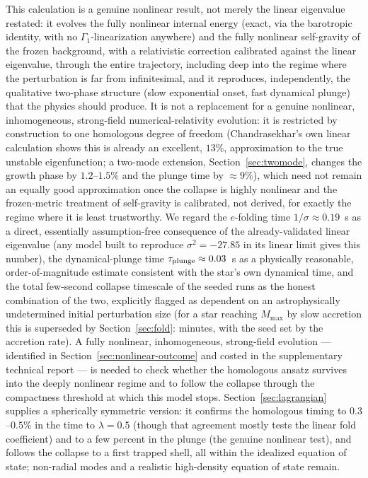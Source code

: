 \documentclass[11pt]{article}
\begin{document}
This calculation is a genuine nonlinear result, not merely the linear eigenvalue restated: it evolves the fully nonlinear internal energy (exact, via the barotropic identity, with no $\Gamma_1$-linearization anywhere) and the fully nonlinear self-gravity of the frozen background, with a relativistic correction calibrated against the linear eigenvalue, through the entire trajectory, including deep into the regime where the perturbation is far from infinitesimal, and it reproduces, independently, the qualitative two-phase structure (slow exponential onset, fast dynamical plunge) that the physics should produce. It is not a replacement for a genuine nonlinear, inhomogeneous, strong-field numerical-relativity evolution: it is restricted by construction to one homologous degree of freedom (Chandrasekhar's own linear calculation shows this is already an excellent, $13\%$, approximation to the true unstable eigenfunction; a two-mode extension, Section~\ref{sec:twomode}, changes the growth phase by $1.2$--$1.5\%$ and the plunge time by $\approx9\%$), which need not remain an equally good approximation once the collapse is highly nonlinear and the frozen-metric treatment of self-gravity is calibrated, not derived, for exactly the regime where it is least trustworthy. We regard the $e$-folding time $1/\sigma\approx0.19$~s as a direct, essentially assumption-free consequence of the already-validated linear eigenvalue (any model built to reproduce $\sigma^2=-27.85$ in its linear limit gives this number), the dynamical-plunge time $\tau_{\rm plunge}\approx0.03$~s as a physically reasonable, order-of-magnitude estimate consistent with the star's own dynamical time, and the total few-second collapse timescale of the seeded runs as the honest combination of the two, explicitly flagged as dependent on an astrophysically undetermined initial perturbation size (for a star reaching $M_{\max}$ by slow accretion this is superseded by Section~\ref{sec:fold}: minutes, with the seed set by the accretion rate). A fully nonlinear, inhomogeneous, strong-field evolution --- identified in Section~\ref{sec:nonlinear-outcome} and costed in the supplementary technical report \citep{OwnbyPhase2} --- is needed to check whether the homologous ansatz survives into the deeply nonlinear regime and to follow the collapse through the compactness threshold at which this model stops. Section~\ref{sec:lagrangian} supplies a spherically symmetric version: it confirms the homologous timing to $0.3$--$0.5\%$ in the time to $\lambda=0.5$ (though that agreement mostly tests the linear fold coefficient) and to a few percent in the plunge (the genuine nonlinear test), and follows the collapse to a first trapped shell, all within the idealized equation of state; non-radial modes and a realistic high-density equation of state remain.
\end{document}
